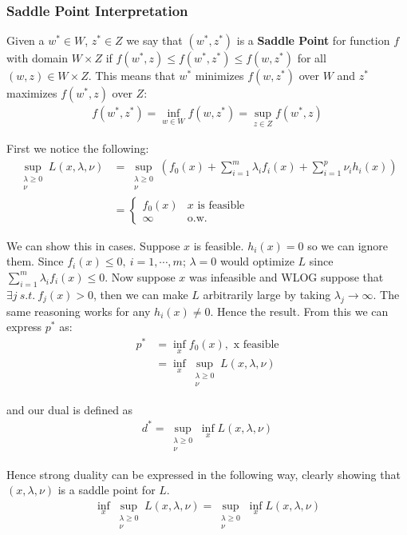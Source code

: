 \documentclass[]{article}
\theoremstyle{mattstyle}
\theoremstyle{definition}
\begin{document}
\subsubsection{Saddle Point Interpretation}

Given a $w^*\in W$, $z^*\in Z$ we say that $(w^*,z^*)$ is a \textbf{Saddle Point} for function $f$ with domain $W \times Z$ if $f(w^*, z) \le f(w^*, z^*) \le f(w, z^*)$ for all $(w,z) \in W \times Z$. This means that $w^*$ minimizes $f(w, z^*)$ over $W$ and $z^*$ maximizes $f(w^*, z)$ over $Z$:
\begin{align*}
f(w^*, z^*) = \inf_{w \in W} f(w, z^*) = \sup_{z \in Z} f(w^*, z)
\end{align*}

First we notice the following:
\begin{align*}
\sup\limits_{\substack{\lambda\ge0 \\ \nu}} L(x, \lambda, \nu) &= \sup\limits_{\substack{\lambda\ge0 \\ \nu}} \left( f_0(x) + \sum_{i=1}^m \lambda_if_i(x) + \sum_{i=1}^p \nu_i h_i(x) \right)\\
&= \begin{cases}
f_0(x) & \text{$x$ is feasible}\\
\infty & \text{o.w.}
\end{cases}
\end{align*}

We can show this in cases. Suppose $x$ is feasible. $h_i(x)=0$ so we can ignore them. Since $f_i(x) \le 0,\ i=1, \cdots, m$; $\lambda = 0$ would optimize $L$ since $\sum_{i=1}^m \lambda_if_i(x) \le 0$. Now suppose $x$ was infeasible and WLOG suppose that $ \exists j \ s.t.\ f_j(x) > 0$, then we can make $L$ arbitrarily large by taking $\lambda_j \rightarrow \infty$. The same reasoning works for any $h_i(x) \ne 0$. Hence the result. From this we can express $p^*$ as:
\begin{align*}
p^* &= \inf_x f_0(x), \text{  x feasible}\\
&= \inf_x\sup_{\substack{\lambda\ge0 \\ \nu}}L(x, \lambda, \nu)
\end{align*}

and our dual is defined as
\begin{align*}
d^* = \sup_{\substack{\lambda\ge0 \\ \nu}}\inf_x L(x, \lambda, \nu)
\end{align*}

Hence strong duality can be expressed in the following way, clearly showing that $(x, \lambda, \nu)$ is a saddle point for $L$.
\begin{align*}
\inf_x\sup_{\substack{\lambda\ge0 \\ \nu}}L(x, \lambda, \nu) = \sup_{\substack{\lambda\ge0 \\ \nu}}\inf_x L(x, \lambda, \nu)
\end{align*}
\end{document}

